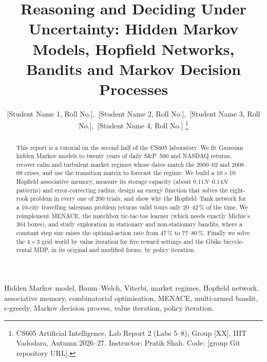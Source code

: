 \documentclass[journal]{IEEEtran}
\begin{document}
\title{Reasoning and Deciding Under Uncertainty: Hidden Markov Models, Hopfield Networks,
Bandits and Markov Decision Processes}

\author{[Student Name 1, Roll No.],~[Student Name 2, Roll No.],~[Student Name 3, Roll No.],~[Student Name 4, Roll No.]%
\thanks{CS605 Artificial Intelligence, Lab Report 2 (Labs 5--8), Group [XX], IIIT Vadodara, Autumn 2026--27. Instructor: Pratik Shah. Code: [group Git repository URL].}}


\maketitle

\begin{abstract}
This report is a tutorial on the second half of the CS605 laboratory. We fit Gaussian hidden
Markov models to twenty years of daily S\&P~500 and NASDAQ returns, recover calm and turbulent
market regimes whose dates match the 2000--02 and 2008--09 crises, and use the transition
matrix to forecast the regime. We build a $10\times10$ Hopfield associative memory, measure its
storage capacity (about $0.11N$--$0.14N$ patterns) and error-correcting radius, design an energy
function that solves the eight-rook problem in every one of 200 trials, and show why the
Hopfield--Tank network for a 10-city travelling salesman problem returns valid tours only
20--42\,\% of the time. We reimplement MENACE, the matchbox tic-tac-toe learner (which needs
exactly Michie's 304 boxes), and study exploration in stationary and non-stationary bandits,
where a constant step size raises the optimal-action rate from 47\,\% to 77--80\,\%. Finally we
solve the $4\times3$ grid world by value iteration for five reward settings and the Gbike
bicycle-rental MDP, in its original and modified forms, by policy iteration.
\end{abstract}

\begin{IEEEkeywords}
Hidden Markov model, Baum--Welch, Viterbi, market regimes, Hopfield network, associative
memory, combinatorial optimisation, MENACE, multi-armed bandit, $\epsilon$-greedy, Markov
decision process, value iteration, policy iteration.
\end{IEEEkeywords}

\end{document}
